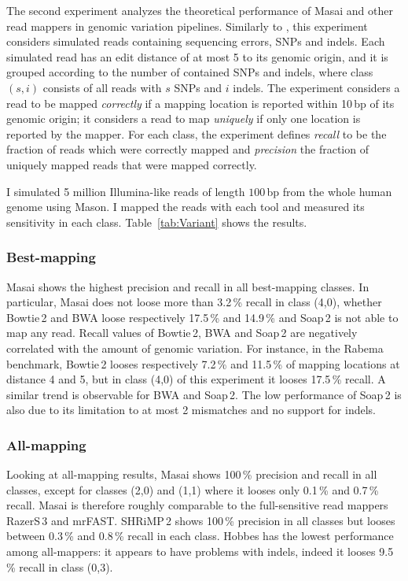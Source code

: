 The second experiment analyzes the theoretical performance of Masai and other read mappers in genomic variation pipelines.
Similarly to \citep{David2011}, this experiment considers simulated reads containing sequencing errors, SNPs and indels.
Each simulated read has an edit distance of at most 5 to its genomic origin, and it is grouped according to the number of contained SNPs and indels, where class $(s,i)$ consists of all reads with $s$ SNPs and $i$ indels.
The experiment considers a read to be mapped \emph{correctly} if a mapping location is reported within 10\,bp of its genomic origin;
it considers a read to map \emph{uniquely} if only one location is reported by the mapper.
For each class, the experiment defines \emph{recall} to be the fraction of reads which were correctly mapped and \emph{precision} the fraction of uniquely mapped reads that were mapped correctly.

I simulated 5 million Illumina-like reads of length $100$\,bp from the whole human genome using Mason.
I mapped the reads with each tool and measured its sensitivity in each class.
Table~\ref{tab:Variant} shows the results.

\subsubsection{Best-mapping}

Masai shows the highest precision and recall in all best-mapping classes.
In particular, Masai does not loose more than 3.2\,\% recall in class (4,0), whether Bowtie\,2 and BWA loose respectively 17.5\,\% and 14.9\,\% and Soap\,2 is not able to map any read.
Recall values of Bowtie\,2, BWA and Soap\,2 are negatively correlated with the amount of genomic variation.
For instance, in the Rabema benchmark, Bowtie\,2 looses respectively 7.2\,\% and 11.5\,\% of mapping locations at distance 4 and 5, but in class (4,0) of this experiment it looses 17.5\,\% recall.
A similar trend is observable for BWA and Soap\,2.
The low performance of Soap\,2 is also due to its limitation to at most 2 mismatches and no support for indels.

\subsubsection{All-mapping}

Looking at all-mapping results, Masai shows 100\,\% precision and recall in all classes, except for classes (2,0) and (1,1) where it looses only 0.1\,\% and 0.7\,\% recall.
Masai is therefore roughly comparable to the full-sensitive read mappers RazerS\,3 and mrFAST.
SHRiMP\,2 shows 100\,\% precision in all classes but looses between 0.3\,\% and 0.8\,\% recall in each class.
Hobbes has the lowest performance among all-mappers: it appears to have problems with indels, indeed it looses 9.5\,\% recall in class (0,3).

